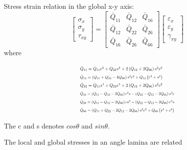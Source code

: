 \documentclass{article}
\begin{document}
Stress strain relation in the global x-y axis:
\begin{equation}\left[\begin{array}{l}\sigma _{x} \\ \sigma _{y} \\ \tau_{xy}\end{array}\right]=\left[\begin{array}{lll}\bar{Q}_{11} & \bar{Q}_{12} & \bar{Q}_{16}\\ \bar{Q}_{12} & \bar{Q}_{22} & \bar{Q}_{26} \\ \bar{Q}_{16} & \bar{Q}_{26} &\bar{Q}_{66}\end{array}\right]\left[\begin{array}{l}\varepsilon_{x} \\ \varepsilon_{y}\\ \gamma_{x y}\end{array}\right]
\end{equation}
where

\begin{equation}
	\begin{array}{l}
		\resizebox{.35\textwidth}{!}{$\bar{Q}_{11}=Q_{11} c^{4}+Q_{22} s^{4}+2\left(Q_{12}+2
		Q_{66}\right) s^{2} c^{2}$} \\

		\resizebox{.35\textwidth}{!}{$\bar{Q}_{12}=\left(Q_{11}+Q_{22}-4 Q_{66}\right) s^{2}
		c^{2}+Q_{12}\left(c^{4}+s^{2}\right)$} \\

		\resizebox{.35\textwidth}{!}{$\bar{Q}_{22}=Q_{11} s^{4}+Q_{22} c^{4}+2\left(Q_{12}+2
		Q_{66}\right) s^{2} c^{2}$} \\

		\resizebox{.4\textwidth}{!}{$\bar{Q}_{16}=\left(Q_{11}-Q_{12}-2 Q_{66}\right) c^{3} s-\left(Q_{22}-Q_{12}-2Q_{66}\right) s^{3} c$}
		 \\ 
		\resizebox{.4\textwidth}{!}{$\bar{Q}_{26}=\left(Q_{11}-Q_{12}-2 Q_{66}\right) c s^{3}-\left(Q_{22}-Q_{12}-2 Q_{66}\right)c^{3} s$}
		 \\ 
	\resizebox{.4\textwidth}{!}	{$\bar{Q}_{66}=\left(Q_{11}+Q_{22}-2 Q_{12}-2 Q_{66}\right)
	s^{2}c^{2}+Q_{66}\left(s^{4}+c^{4}\right)$}\\
	\end{array}
\end{equation}


The c and s denotes $cos\theta $ and $sin\theta $.

The local and global stresses in an angle lamina are related
\end{document}
